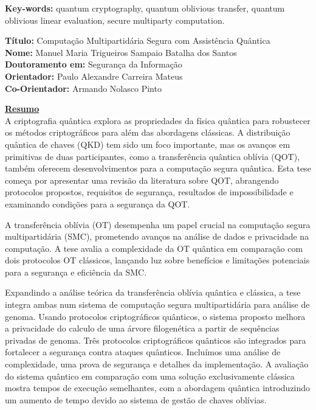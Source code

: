 \documentclass[12pt]{report}
\begin{document}
\vfill

\begin{flushleft}
\textbf{Key-words:} quantum cryptography, quantum oblivious transfer, quantum oblivious
linear evaluation, secure multiparty computation.
\end{flushleft}


\newpage


\noindent \textbf{T\'{i}tulo:} Computa\c{c}\~{a}o Multipartid\'{a}ria Segura com Assist\^{e}ncia Qu\^{a}ntica\\
\textbf{Nome:} Manuel Maria Trigueiros Sampaio Batalha dos Santos\\
\textbf{Doutoramento em:} Seguran\c{c}a da Informa\c{c}\~{a}o\\
\textbf{Orientador:} Paulo Alexandre Carreira Mateus\\
\textbf{Co-Orientador:} Armando Nolasco Pinto\\
\vspace{2\baselineskip}

\underline{\textbf{Resumo}}\\
A criptografia quântica explora as propriedades da física quântica para robustecer os métodos criptográficos para além das abordagens clássicas. A distribuição quântica de chaves (QKD) tem sido um foco importante, mas os avanços em primitivas de duas participantes, como a transferência quântica oblívia (QOT), também oferecem desenvolvimentos para a computação segura quântica. Esta tese começa por apresentar uma revisão da literatura sobre QOT, abrangendo protocolos propostos, requisitos de segurança, resultados de impossibilidade e examinando condições para a segurança da QOT.

A transferência oblívia (OT) desempenha um papel crucial na computação segura multipartidária (SMC), prometendo avanços na análise de dados e privacidade na computação. A tese avalia a complexidade da OT quântica em comparação com dois protocolos OT clássicos, lançando luz sobre benefícios e limitações potenciais para a segurança e eficiência da SMC.

Expandindo a análise teórica da transferência oblívia quântica e clássica, a tese integra ambas num sistema de computação segura multipartidária para análise de genoma. Usando protocolos criptográficos quânticos, o sistema proposto melhora a privacidade do calculo de uma árvore filogenética a partir de sequências privadas de genoma. Três protocolos criptográficos quânticos são integrados para fortalecer a segurança contra ataques quânticos. Incluímos uma análise de complexidade, uma prova de segurança e detalhes da implementação. A avaliação do sistema quântico em comparação com uma solução exclusivamente clássica mostra tempos de execução semelhantes, com a abordagem quântica introduzindo um aumento de tempo devido ao sistema de gestão de chaves oblívias.
\end{document}
